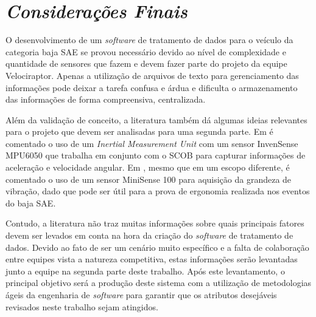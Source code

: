 \chapter{\textit{Considerações Finais}}
	\label{ch:consideracoes}
O desenvolvimento de um \textit{software} de tratamento de dados para o veículo da categoria baja SAE se provou necessário devido ao nível de complexidade e quantidade de sensores que fazem e devem fazer parte do projeto da equipe Velociraptor. Apenas a utilização de arquivos de texto para gerenciamento das informações pode deixar a tarefa confusa e árdua e dificulta o armazenamento das informações de forma compreensiva, centralizada.

Além da validação de conceito, a literatura também dá algumas ideias relevantes para o projeto que devem ser analisadas para uma segunda parte. Em  é comentado o uso de um \textit{Inertial Measurement Unit} com um sensor InvenSense MPU6050 que trabalha em conjunto com o SCOB para capturar informações de aceleração e velocidade angular. Em , mesmo que em um escopo diferente, é comentado o uso de um sensor MiniSense 100 para aquisição da grandeza de vibração, dado que pode ser útil para a prova de ergonomia realizada nos eventos do baja SAE.

Contudo, a literatura não traz muitas informações sobre quais principais fatores devem ser levados em conta na hora da criação do \textit{software} de tratamento de dados. Devido ao fato de ser um cenário muito específico e a falta de colaboração entre equipes vista a natureza competitiva, estas informações serão levantadas junto a equipe na segunda parte deste trabalho. Após este levantamento, o principal objetivo será a produção deste sistema com a utilização de metodologias ágeis da engenharia de \textit{software} para garantir que os atributos desejáveis revisados neste trabalho sejam atingidos.        